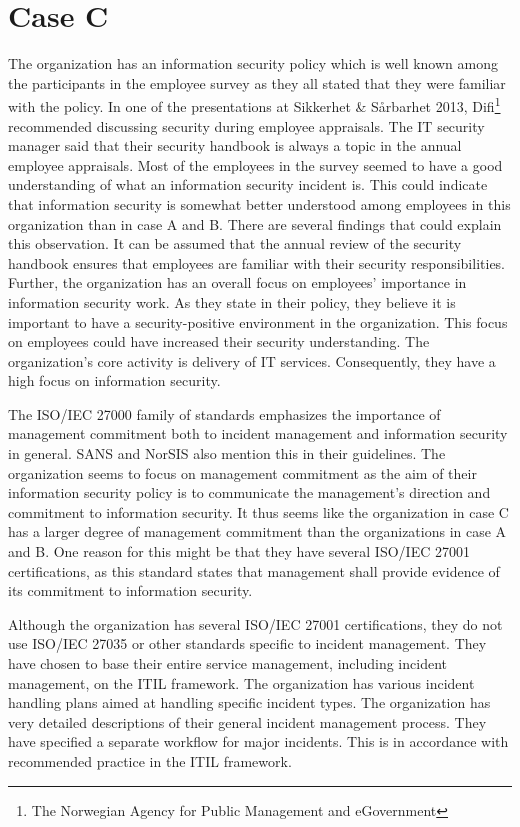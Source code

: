 \section{Case C}
The organization has an information security policy which is well known among the participants in the employee survey as they all stated that they were familiar with the policy. In one of the presentations at Sikkerhet \& S\aa rbarhet 2013, Difi\footnote{The Norwegian Agency for Public Management and eGovernment} recommended discussing security during employee appraisals. The IT security manager said that their security handbook is always a topic in the annual employee appraisals. Most of the employees in the survey seemed to have a good understanding of what an information security incident is. This could indicate that information security is somewhat better understood among employees in this organization than in case A and B. There are several findings that could explain this observation. It can be assumed that the annual review of the security handbook ensures that employees are familiar with their security responsibilities. Further, the organization has an overall focus on employees' importance in information security work. As they state in their policy, they believe it is important to have a security-positive environment in the organization. This focus on employees could have increased their security understanding. The organization's core activity is delivery of IT services. Consequently, they have a high focus on information security.

The ISO/IEC 27000 family of standards emphasizes the importance of management commitment both to incident management and information security in general. SANS and NorSIS also mention this in their guidelines. The organization seems to focus on management commitment as the aim of their information security policy is to communicate the management's direction and commitment to information security. It thus seems like the organization in case C has a larger degree of management commitment than the organizations in case A and B. One reason for this might be that they have several ISO/IEC 27001 certifications, as this standard states that management shall provide evidence of its commitment to information security.

Although the organization has several ISO/IEC 27001 certifications, they do not use ISO/IEC 27035 or other standards specific to incident management. They have chosen to base their entire service management, including incident management, on the ITIL framework. The organization has various incident handling plans aimed at handling specific incident types. The organization has very detailed descriptions of their general incident management process. They have specified a separate workflow for major incidents. This is in accordance with recommended practice in the ITIL framework. 
 
